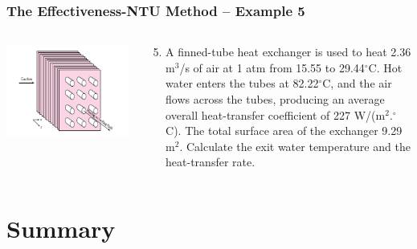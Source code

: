 \documentclass[10pt,compress,unknownkeysallowed]{beamer}
\begin{document}
\begin{frame}
  \frametitle{ The Effectiveness-NTU Method -- Example 5}
    \begin{columns}
       \begin{column}[l]{0.58\linewidth}
         \includegraphics[width=1.1\columnwidth,clip]{./Pics/CrossFlowHE_UnmixedFluids_Example}
       \end{column}
       \begin{column}[l]{0.42\linewidth}
          \begin{enumerate}\setcounter{enumi}{4}
              \item A finned-tube heat exchanger is used to heat 2.36 m$^{3}$/s of air at 1 atm from 15.55 to 29.44$^{\circ}$C. Hot water enters the tubes at 82.22$^{\circ}$C, and the air flows across the tubes, producing an average overall heat-transfer coefficient of 227 W/(m$^{2}$.$^{\circ}$C). The total surface area of the exchanger 9.29 m$^{2}$. Calculate the exit water temperature and the heat-transfer rate.
          \end{enumerate}
       \end{column}      
    \end{columns}
\end{frame}



\section{Summary}
\end{document}
